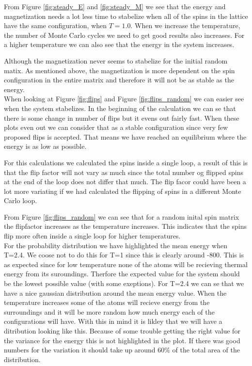 \documentclass{article}
\begin{document}
{{{	%
	From Figure \ref{fig:steady_E} and \ref{fig:steady_M} we see that the energy and magnetization needs a lot less time to stabelize when all of the spins in the lattice have the same configuration, when $T = 1.0$. When we increase the temperature, the number of Monte Carlo cycles we need to get good results also increases. For a higher temperature we can also see that the energy in the system increases.

 	Although the magnetization never seems to stabelize for the initial random matix. As mentioned above, the magnetization is more dependent on the spin configuration in the entire matrix and therefore it will not be as stable as the energy.\\

	 When looking at Figure \ref{fig:flips} and Figure \ref{fig:flips_random} we can easier see when the system stabelizes. In the beginning of the calculation we can se that there is some change in number of flips but it evens out fairly fast. When these plots even out we can consider that as a stable configuration since very few proposed flips is accepted. That means we have reached an equilibrium where the energy is as low as possible.

	 For this calculations we calculated the spins inside a single loop, a result of this is that the flip factor will not vary as much since the total number og flipped spins at the end of the loop does not differ that much. The flip facor could have been a lot more variating if we had calculated the flipping of spins in a different Monte Carlo loop.

	 From Figure \ref{fig:flips_random} we can see that for a random inital spin matrix the flipfactor increases as the temperature increases. This indicates that the spins flip more often inside a single loop for higher temperatures.\\

	For the probability distribution we have highlighted the mean energy when T=2.4. We coose not to do this for T=1 since this is clearly around -800. This is as expected since for low temperature none of the atoms will be recieving thermal energy from its suroundings. Therfore the expected value for the system should be the lowest possible value (with some exeptions). For T=2.4 we can se that we have a nice gaussian distribution around the mean energy value. When the temperature increases some of the atoms will recieve energy from the surroundings and it will be more random how much energy each of the configurations will have. With this in mind it is likley that we will have a ditribution looking like this. Because of some trouble getting the right value for the variance for the energy this is not highlighted in the plot. If there was good numbers for the variation it should take up around 60\% of the total area of the distribution.

}}}
\end{document}
